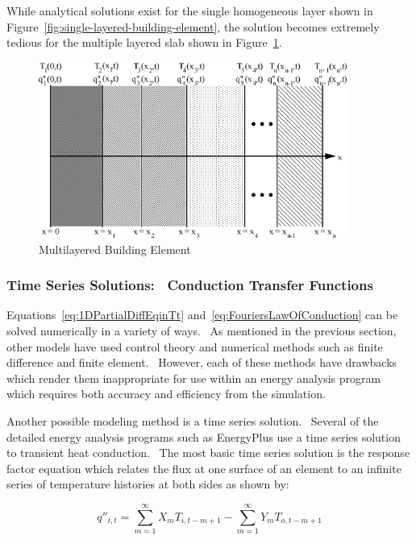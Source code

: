 While analytical solutions exist for the single homogeneous layer shown in Figure~\ref{fig:single-layered-building-element}, the solution becomes extremely tedious for the multiple layered slab shown in Figure~\ref{fig:multilayered-building-element}.

\begin{figure}[hbtp] %
\centering
\includegraphics[width=0.9\textwidth, height=0.9\textheight, keepaspectratio=true]{media/image5974.png}
\caption{Multilayered Building Element \protect \label{fig:multilayered-building-element}}
\end{figure}

\subsubsection{Time Series Solutions:~ Conduction Transfer Functions}\label{time-series-solutions-conduction-transfer-functions}

Equations~\ref{eq:1DPartialDiffEqinTt} and~\ref{eq:FouriersLawOfConduction} can be solved numerically in a variety of ways.~ As mentioned in the previous section, other models have used control theory and numerical methods such as finite difference and finite element.~ However, each of these methods have drawbacks which render them inappropriate for use within an energy analysis program which requires both accuracy and efficiency from the simulation.

Another possible modeling method is a time series solution.~ Several of the detailed energy analysis programs such as EnergyPlus use a time series solution to transient heat conduction.~ The most basic time series solution is the response factor equation which relates the flux at one surface of an element to an infinite series of temperature histories at both sides as shown by:

\begin{equation}
{q''_{i,t}} = \sum\limits_{m = 1}^\infty  {{X_m}{T_{i,t - m + 1}}}  - \sum\limits_{m = 1}^\infty  {{Y_m}{T_{o,t - m + 1}}}
\end{equation}

